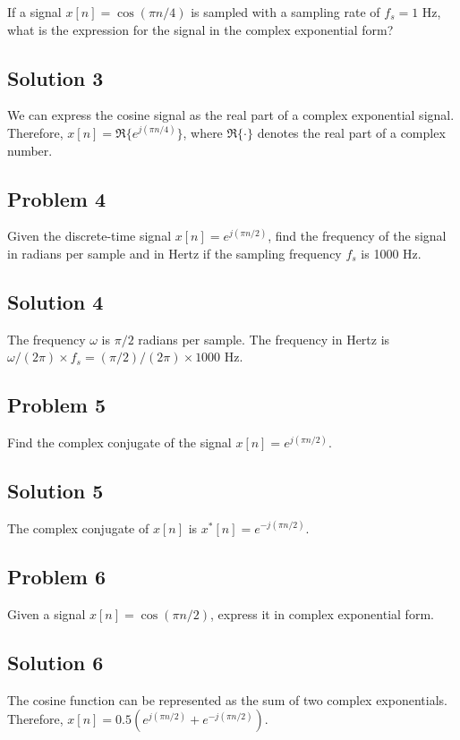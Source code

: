 \documentclass[11pt]{article}
\begin{document}
If a signal $x[n] = \cos(\pi n / 4)$ is sampled with a sampling rate of $f_s = 1$ Hz, what is the expression for the signal in the complex exponential form?

\subsection*{Solution 3}

We can express the cosine signal as the real part of a complex exponential signal. Therefore, $x[n] = \Re\{e^{j(\pi n / 4)}\}$, where $\Re\{\cdot\}$ denotes the real part of a complex number.

\subsection*{Problem 4}
Given the discrete-time signal $x[n] = e^{j(\pi n/2)}$, find the frequency of the signal in radians per sample and in Hertz if the sampling frequency $f_s$ is 1000 Hz.

\subsection*{Solution 4}
The frequency $\omega$ is $\pi/2$ radians per sample. The frequency in Hertz is $\omega / (2 \pi) \times f_s = (\pi / 2) / (2 \pi) \times 1000$ Hz.

\subsection*{Problem 5}
Find the complex conjugate of the signal $x[n] = e^{j(\pi n/2)}$. 

\subsection*{Solution 5}
The complex conjugate of $x[n]$ is $x^*[n] = e^{-j(\pi n/2)}$.

\subsection*{Problem 6}
Given a signal $x[n] = \cos(\pi n / 2)$, express it in complex exponential form. 

\subsection*{Solution 6}
The cosine function can be represented as the sum of two complex exponentials. Therefore, $x[n] = 0.5(e^{j(\pi n/2)} + e^{-j(\pi n/2)})$.
\end{document}
